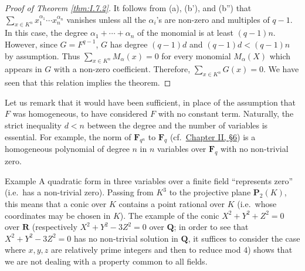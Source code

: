 \begin{proof}[Proof of Theorem \ref{thm:I.7.2}]
It follows from (a), (b'), and (b'') that
$\sum_{x\in K^{n}}x_{1}^{\alpha_{1}}\cdots x_{n}^{\alpha_{n}}$ vanishes
unless all the $\alpha_{i}$'s are non-zero and multiples of $q-1$. In this
case, the degree $\alpha_{1}+\cdots+\alpha_{n}$ of the monomial is at least
$(q-1)n$. However, since $G=F^{q-1}$, $G$ has degree $(q-1)d$ and
$(q-1)d<(q-1)n$ by assumption. Thus
$\sum_{x\in K^{n}}M_{\alpha}(x)=0$ for every monomial $M_{\alpha}(X)$ which
appears in $G$ with a non-zero coefficient. Therefore,
$\sum_{x\in K^{n}}G(x)=0$. We have seen that this relation implies the
theorem.
\end{proof}

Let us remark that it would have been sufficient, in place of the assumption
that $F$ was homogeneous, to have considered $F$ with no constant term.
Naturally, the strict inequality $d<n$ between the degree and the number of
variables is essential. For example, the norm of $\mathbf{F}_{q^{n}}$ to
$\mathbf{F}_{q}$ (cf.\ \hyperref[sec:2.6]{Chapter II, §6}) is a homogeneous polynomial of degree
$n$ in $n$ variables over $\mathbf{F}_{q}$ with no non-trivial zero.

\begin{statement}{Example}
A quadratic form in three variables over a finite field ``represents
zero'' (i.e.\ has a non-trivial zero). Passing from $K^{3}$ to the
projective plane $\mathbf{P}_{2}(K)$, this means that a conic over $K$
contains a point rational over $K$ (i.e.\ whose coordinates may be chosen in
$K$). The example of the conic $X^{2}+Y^{2}+Z^{2}=0$ over $\mathbf{R}$
(respectively $X^{2}+Y^{2}-3Z^{2}=0$ over $\mathbf{Q}$; in order to see that
$X^{2}+Y^{2}-3Z^{2}=0$ has no non-trivial solution in $\mathbf{Q}$, it
suffices to consider the case where $x,y,z$ are relatively prime integers
and then to reduce mod $4$) shows that we are not dealing with a property
common to all fields.
\end{statement}
